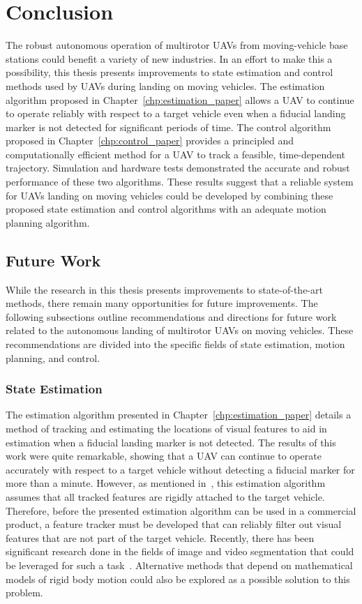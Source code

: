 
\chapter{Conclusion}
\label{chp:conclusion}

The robust autonomous operation of multirotor UAVs from moving-vehicle base
stations could benefit a
variety of new industries.
In an effort to make this a possibility,
this
thesis presents improvements to state estimation and control methods used by UAVs
during landing on moving vehicles.
The estimation algorithm proposed in
Chapter~\ref{chp:estimation_paper}
allows a UAV to continue to operate reliably with respect to a target vehicle
even when a fiducial landing marker is not detected for significant
periods of time.
The control algorithm proposed in Chapter~\ref{chp:control_paper} provides a principled
and computationally efficient method for a UAV to track a feasible, time-dependent
trajectory.
Simulation and hardware tests demonstrated the accurate and robust performance
of these two algorithms.
These results suggest that a reliable system for UAVs landing
on moving vehicles could be developed by combining these proposed state
estimation and control algorithms with an adequate motion planning algorithm.

\section{Future Work}
\label{sec:future_work}
While the research in this thesis presents improvements to 
state-of-the-art methods, there remain many opportunities for future
improvements.
The following subsections outline
recommendations and directions for future work related to the autonomous
landing of multirotor UAVs on moving vehicles.
These recommendations are divided into the specific fields of state estimation,
motion planning, and control.

\subsection{State Estimation}
The estimation algorithm presented in Chapter~\ref{chp:estimation_paper} details
a method of tracking and estimating the locations of visual features 
to aid in estimation when a fiducial landing marker is
not detected. The results of this work were quite remarkable, showing that a UAV
can continue to operate accurately with respect to a target vehicle without
detecting a fiducial marker for more
than a minute. However, as mentioned in~, this estimation algorithm
assumes that all tracked features are rigidly attached to the target vehicle.
Therefore, before the presented estimation algorithm can be used in a commercial
product, a feature tracker must be developed that can reliably filter out visual
features that are not part of the target vehicle.
Recently, there has been significant research done
in the fields of image and video segmentation that could be leveraged for such a
task~\cite{chen2018encoder}. Alternative methods that depend on
mathematical models of rigid body motion could also be explored as a possible
solution to this problem.

